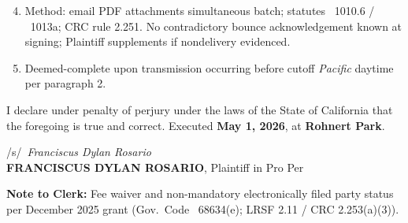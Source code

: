 \begin{enumerate}\setcounter{enumi}{3}
\item Method: email PDF attachments simultaneous batch; statutes \textsection~1010.6 / \textsection~1013a; CRC rule 2.251. No contradictory bounce acknowledgement known at signing; Plaintiff supplements if nondelivery evidenced.\par
\item Deemed-complete upon transmission occurring before cutoff \textit{Pacific} daytime per paragraph 2.
\end{enumerate}\vspace{\baselineskip}

I declare under penalty of perjury under the laws of the State of California that the foregoing is true and correct. Executed \textbf{May 1, 2026}, at \textbf{Rohnert Park}.

\vspace{0.2\baselineskip}
\begin{singlespace}\begin{flushleft}
/s/\ \textit{Franciscus Dylan Rosario}\\[4pt]
\textbf{FRANCISCUS DYLAN ROSARIO}, Plaintiff in Pro Per
\end{flushleft}\end{singlespace}

\textbf{Note to Clerk:} Fee waiver and non-mandatory electronically filed party status per December 2025 grant (Gov.\ Code \textsection~68634(e); LRSF 2.11 / CRC 2.253(a)(3)).



